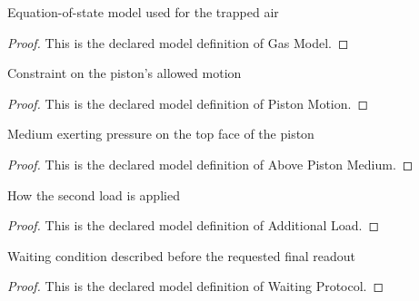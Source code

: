 \begin{definition}
  \label{def:physics:phyx-mini-0360:phyxminiproblems-problemphyxmini0360-gasmodel}
  Equation-of-state model used for the trapped air
\end{definition}
\begin{proof}
  This is the declared model definition of Gas Model.
\end{proof}
\begin{definition}
  \label{def:physics:phyx-mini-0360:phyxminiproblems-problemphyxmini0360-pistonmotion}
  Constraint on the piston's allowed motion
\end{definition}
\begin{proof}
  This is the declared model definition of Piston Motion.
\end{proof}
\begin{definition}
  \label{def:physics:phyx-mini-0360:phyxminiproblems-problemphyxmini0360-abovepistonmedium}
  Medium exerting pressure on the top face of the piston
\end{definition}
\begin{proof}
  This is the declared model definition of Above Piston Medium.
\end{proof}
\begin{definition}
  \label{def:physics:phyx-mini-0360:phyxminiproblems-problemphyxmini0360-additionalload}
  How the second load is applied
\end{definition}
\begin{proof}
  This is the declared model definition of Additional Load.
\end{proof}
\begin{definition}
  \label{def:physics:phyx-mini-0360:phyxminiproblems-problemphyxmini0360-waitingprotocol}
  Waiting condition described before the requested final readout
\end{definition}
\begin{proof}
  This is the declared model definition of Waiting Protocol.
\end{proof}
